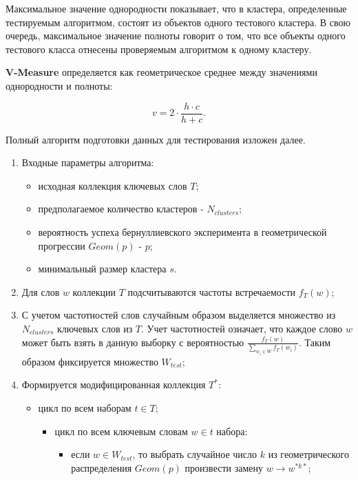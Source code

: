 \begin{itemize}
        Максимальное значение однородности показывает, что в кластера, определенные тестируемым алгоритмом, состоят из объектов одного тестового кластера. В свою очередь, максимальное значение полноты говорит о том, что все объекты одного тестового класса отнесены проверяемым алгоритмом к одному кластеру.

        \textbf{V-Measure} определяется как геометрическое среднее между значениями однородности и полноты:

        $$ v = 2 \cdot \frac{h \cdot c}{h + c}.$$
\end{itemize}

Полный алгоритм подготовки данных для тестирования изложен далее.

\begin{enumerate}
    \item Входные параметры алгоритма:
        \begin{itemize} 
            \item исходная коллекция ключевых слов $T$;
            \item предполагаемое количество кластеров - $N_{clusters}$;
            \item вероятность успеха бернуллиевского эксперимента в геометрической прогрессии $Geom(p)$ - $p$;
            \item минимальный размер кластера $s$.
        \end{itemize}
    \item Для слов $w$ коллекции $T$ подсчитываются частоты встречаемости $f_T(w)$;
    \item С учетом частотностей слов случайным образом выделяется множество из $N_{clusters}$ ключевых слов из $T$. Учет частотностей означает, что каждое слово $w$ может быть взять в данную выборку с вероятностью $\frac{f_T(w)}{\sum_{w_i \in W} f_T(w_i)}$. Таким образом фиксируется множество $W_{test}$;
    \item Формируется модифицированная коллекция $T^*$:
        \begin{itemize}
            \item цикл по всем наборам $t \in T$;
                \begin{itemize}
                    \item цикл по всем ключевым словам $w \in t$ набора:
                        \begin{itemize}
                            \item если $w \in W_{test}$, то выбрать случайное число $k$ из геометрического распределения $Geom(p)$ произвести замену $w \rightarrow w^{*k*}$;

\end{itemize}
\end{itemize}
\end{itemize}
\end{enumerate}
